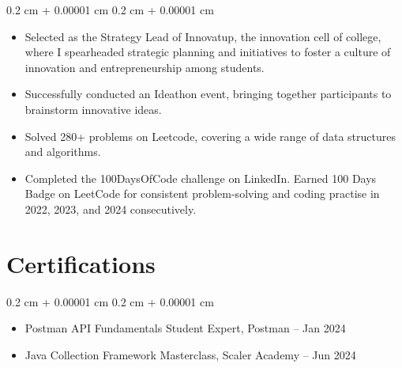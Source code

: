 \documentclass[10pt, letterpaper]{article}
\newenvironment{highlights}{
    \begin{itemize}[
        topsep=0.10 cm,
        parsep=0.10 cm,
        partopsep=0pt,
        itemsep=0pt,
        leftmargin=0.4 cm + 10pt
    ]
}{
    \end{itemize}
} %
\newenvironment{onecolentry}{
    \begin{adjustwidth}{
        0.2 cm + 0.00001 cm
    }{
        0.2 cm + 0.00001 cm
    }
}{
    \end{adjustwidth}
} %
\begin{document}
        \vspace{0.10 cm}
        \begin{onecolentry}
            \begin{highlights}
                \item Selected as the Strategy Lead of Innovatup, the innovation cell of college, where I spearheaded strategic planning and initiatives to foster a culture of innovation and entrepreneurship among students.
                \item Successfully conducted an Ideathon event, bringing together participants to brainstorm innovative ideas.
                \item Solved 280+ problems on Leetcode, covering a wide range of data structures and algorithms. 
                \item Completed the 100DaysOfCode challenge on LinkedIn. Earned 100 Days Badge on LeetCode for consistent problem-solving and coding practise in 2022, 2023, and 2024 consecutively.
            \end{highlights}
        \end{onecolentry}


\section{Certifications}


        \vspace{0.10 cm}
        \begin{onecolentry}
            \begin{highlights}
                \item Postman API Fundamentals Student Expert, Postman – Jan 2024
                \item Java Collection Framework Masterclass, Scaler Academy – Jun 2024
            \end{highlights}
        \end{onecolentry}

    \vspace{-0.3cm}
 
    
\end{document}

